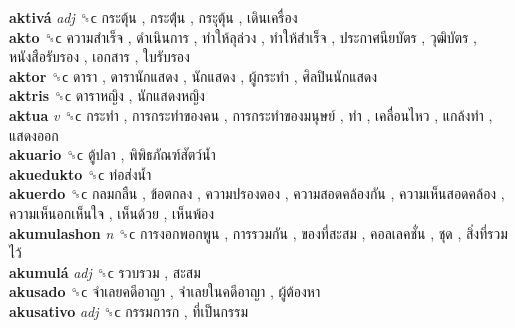 \textbf{aktivá} \emph{adj}  ␝ϲ   กระตุ้น ,  กระตุ้่น ,  กระุตุ้น ,  เดินเครื่อง   \\
\textbf{akto} ␝ϲ   ความสำเร็จ ,  ดำเนินการ ,  ทำให้ลุล่วง ,  ทำให้สำเร็จ ,  ประกาศนียบัตร ,  วุฒิบัตร ,  หนังสือรับรอง ,  เอกสาร ,  ใบรับรอง   \\
\textbf{aktor} ␝ϲ   ดารา ,  ดารานักแสดง ,  นักแสดง ,  ผู้กระทำ ,  ศิลปินนักแสดง   \\
\textbf{aktris} ␝ϲ   ดาราหญิง ,  นักแสดงหญิง   \\
\textbf{aktua} \emph{v}  ␝ϲ   กระทำ ,  การกระทำของคน ,  การกระทำของมนุษย์ ,  ทำ ,  เคลื่อนไหว ,  แกล้งทำ ,  แสดงออก   \\
\textbf{akuario} ␝ϲ   ตู้ปลา ,  พิพิธภัณฑ์สัตว์น้ำ   \\
\textbf{akuedukto} ␝ϲ   ท่อส่งน้ำ   \\
\textbf{akuerdo} ␝ϲ   กลมกลืน ,  ข้อตกลง ,  ความปรองดอง ,  ความสอดคล้องกัน ,  ความเห็นสอดคล้อง ,  ความเห็นอกเห็นใจ ,  เห็นด้วย ,  เห็นพ้อง   \\
\textbf{akumulashon} \emph{n}  ␝ϲ   การงอกพอกพูน ,  การรวมกัน ,  ของที่สะสม ,  คอลเลคชั่น ,  ชุด ,  สิ่งที่รวมไว้   \\
\textbf{akumulá} \emph{adj}  ␝ϲ   รวบรวม ,  สะสม   \\
\textbf{akusado} ␝ϲ   จำเลยคดีอาญา ,  จำเลยในคดีอาญา ,  ผู้ต้องหา   \\
\textbf{akusativo} \emph{adj}  ␝ϲ   กรรมการก ,  ที่เป็นกรรม   \\
